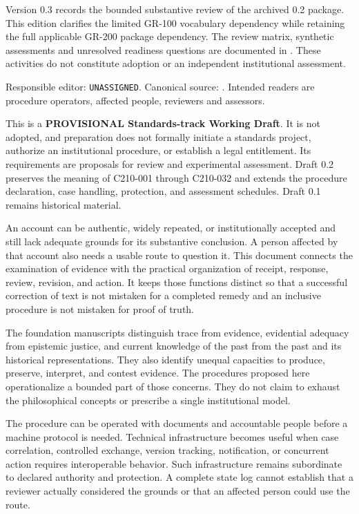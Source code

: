 \documentclass[11pt,a4paper]{article}
\begin{document}
\GSPfrontmatter
{}
Version 0.3 records the bounded substantive review of the archived 0.2 package. This edition clarifies the limited GR-100 vocabulary dependency while retaining the full applicable GR-200 package dependency. The review matrix, synthetic assessments and unresolved readiness questions are documented in . These activities do not constitute adoption or an independent institutional assessment.

Responsible editor: \texttt{UNASSIGNED}. Canonical source: . Intended readers are procedure operators, affected people, reviewers and assessors.

This is a \textbf{PROVISIONAL Standards-track Working Draft}. It is not adopted, and preparation does not formally initiate a standards project, authorize an institutional procedure, or establish a legal entitlement. Its requirements are proposals for review and experimental assessment. Draft 0.2 preserves the meaning of C210-001 through C210-032 and extends the procedure declaration, case handling, protection, and assessment schedules. Draft 0.1 remains historical material.

\tableofcontents\clearpage
{}
An account can be authentic, widely repeated, or institutionally accepted and still lack adequate grounds for its substantive conclusion. A person affected by that account also needs a usable route to question it. This document connects the examination of evidence with the practical organization of receipt, response, review, revision, and action. It keeps those functions distinct so that a successful correction of text is not mistaken for a completed remedy and an inclusive procedure is not mistaken for proof of truth.

The foundation manuscripts distinguish trace from evidence, evidential adequacy from epistemic justice, and current knowledge of the past from the past and its historical representations. They also identify unequal capacities to produce, preserve, interpret, and contest evidence. The procedures proposed here operationalize a bounded part of those concerns. They do not claim to exhaust the philosophical concepts or prescribe a single institutional model.

The procedure can be operated with documents and accountable people before a machine protocol is needed. Technical infrastructure becomes useful when case correlation, controlled exchange, version tracking, notification, or concurrent action requires interoperable behavior. Such infrastructure remains subordinate to declared authority and protection. A complete state log cannot establish that a reviewer actually considered the grounds or that an affected person could use the route.
\end{document}
